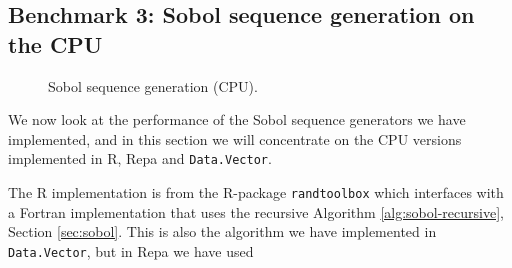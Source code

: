 \subsection{Benchmark 3: Sobol sequence generation on the CPU}
\begin{figure}
	\centering
  \begin{adjustbox}{minipage=1.3\textwidth,margin=0pt \smallskipamount,center}
\end{adjustbox}
  \caption{Sobol sequence generation (CPU).}
\label{fig:sobol-cpu}
\end{figure}

We now look at the performance of the Sobol sequence generators we
have implemented, and in this section we will concentrate on the CPU
versions implemented in R, Repa and \texttt{Data.Vector}.

The R implementation is from the R-package \texttt{randtoolbox} which
interfaces with a Fortran implementation that uses the recursive
Algorithm \ref{alg:sobol-recursive}, Section \ref{sec:sobol}. This
is also the algorithm we have implemented in \texttt{Data.Vector}, but
in Repa we have used 

